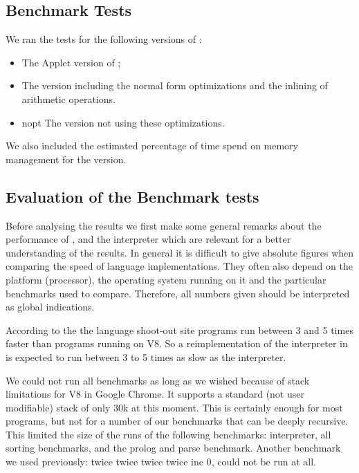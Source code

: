 \subsection{Benchmark Tests}
We ran the tests for the following versions of \Sapl: 
\begin{itemize}
\item{\Sapl} The \Java Applet version of \Sapl;
\item{\Sapljs} The \Sapljs version including the normal form optimizations and the inlining of arithmetic operations. 
\item{\Sapljs nopt} The version not using these optimizations.
\end{itemize}
We also  included the estimated percentage of time spend on memory management for the \Sapljs version.

%

\subsection{Evaluation of the Benchmark tests}
Before analysing the results we first make some general remarks about the performance of \Java, \JS and the \Sapl interpreter which are relevant for
a better understanding of the results. In general it is difficult to give absolute figures when comparing the speed of language implementations. 
They often also depend on the platform (processor), the operating system running on it and the particular benchmarks used to compare. 
Therefore, all numbers given should be interpreted as global indications. 

According to the the language shoot-out site \cite{SHOOTOUT} \Java 
programs run between 3 and 5 times faster than \JS programs running on V8. 
So a reimplementation of the \Sapl interpreter in \JS is expected to run between 3 to 5 times as slow as the \Sapl interpreter.

We could not run all benchmarks as long as we wished because of stack limitations for V8 \JS in Google Chrome. 
It supports a standard (not user modifiable) stack of only 30k at this moment.
This is certainly enough for most \JS programs, but not for a number of our benchmarks that can be deeply recursive. 
This limited the size of the runs of the following benchmarks: interpreter, all sorting benchmarks, and the prolog and parse benchmark. 
Another benchmark we used previously: \textsf{twice twice twice twice inc 0}, could not be run at all.

